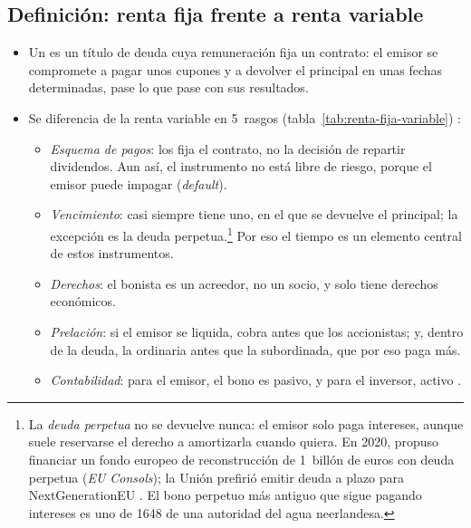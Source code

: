 \documentclass[11pt]{article}
\begin{document}
\subsection{Definición: renta fija frente a renta variable}\label{sec:definicion}

\begin{itemize}
\item Un  es un título de deuda cuya remuneración fija un contrato: el emisor se compromete a pagar unos cupones y a devolver el principal en unas fechas determinadas, pase lo que pase con sus resultados.
\item Se diferencia de la renta variable en 5~rasgos (tabla~\ref{tab:renta-fija-variable}) :
  \begin{itemize}
  \item \emph{Esquema de pagos}: los fija el contrato, no la decisión de repartir dividendos. Aun así, el instrumento no está libre de riesgo, porque el emisor puede impagar (\emph{default}).
  \item \emph{Vencimiento}: casi siempre tiene uno, en el que se devuelve el principal; la excepción es la deuda perpetua.\footnote{La \emph{deuda perpetua} no se devuelve nunca: el emisor solo paga intereses, aunque suele reservarse el derecho a amortizarla cuando quiera. En 2020,  propuso financiar un fondo europeo de reconstrucción de 1~billón de euros con deuda perpetua (\emph{EU Consols})\nocite{Garicano2020Reconstruction}; la Unión prefirió emitir deuda a plazo para NextGenerationEU . El bono perpetuo más antiguo que sigue pagando intereses es uno de 1648 de una autoridad del agua neerlandesa\nocite{Esteve2023Perpetuo}.} Por eso el tiempo es un elemento central de estos instrumentos.
  \item \emph{Derechos}: el bonista es un acreedor, no un socio, y solo tiene derechos económicos.
  \item \emph{Prelación}: si el emisor se liquida, cobra antes que los accionistas; y, dentro de la deuda, la ordinaria antes que la subordinada, que por eso paga más.
  \item \emph{Contabilidad}: para el emisor, el bono es pasivo, y para el inversor, activo .
  \end{itemize}
\end{itemize}
\end{document}
